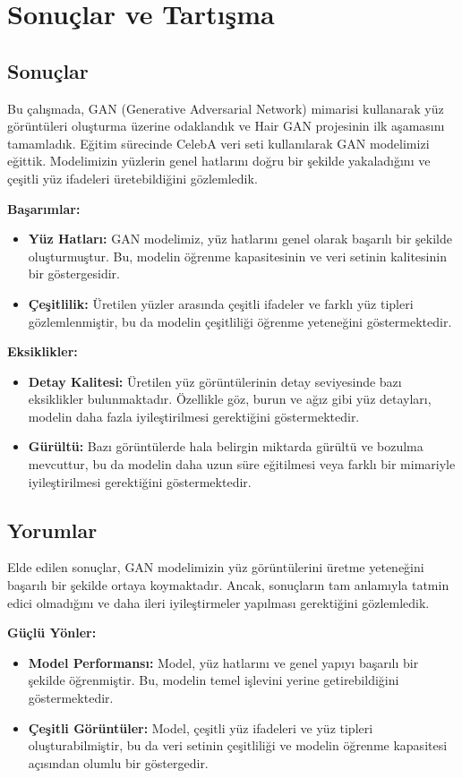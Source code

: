 \documentclass[12pt]{article}
\begin{document}
\clearpage
\section{Sonuçlar ve Tartışma}


\subsection{Sonuçlar}
Bu çalışmada, GAN (Generative Adversarial Network) mimarisi kullanarak yüz görüntüleri oluşturma üzerine odaklandık ve Hair GAN projesinin ilk aşamasını tamamladık. Eğitim sürecinde CelebA veri seti kullanılarak GAN modelimizi eğittik. Modelimizin yüzlerin genel hatlarını doğru bir şekilde yakaladığını ve çeşitli yüz ifadeleri üretebildiğini gözlemledik.

\textbf{Başarımlar:}
\begin{itemize}
    \item \textbf{Yüz Hatları:} GAN modelimiz, yüz hatlarını genel olarak başarılı bir şekilde oluşturmuştur. Bu, modelin öğrenme kapasitesinin ve veri setinin kalitesinin bir göstergesidir.
    \item \textbf{Çeşitlilik:} Üretilen yüzler arasında çeşitli ifadeler ve farklı yüz tipleri gözlemlenmiştir, bu da modelin çeşitliliği öğrenme yeteneğini göstermektedir.
\end{itemize}

\textbf{Eksiklikler:}
\begin{itemize}
    \item \textbf{Detay Kalitesi:} Üretilen yüz görüntülerinin detay seviyesinde bazı eksiklikler bulunmaktadır. Özellikle göz, burun ve ağız gibi yüz detayları, modelin daha fazla iyileştirilmesi gerektiğini göstermektedir.
    \item \textbf{Gürültü:} Bazı görüntülerde hala belirgin miktarda gürültü ve bozulma mevcuttur, bu da modelin daha uzun süre eğitilmesi veya farklı bir mimariyle iyileştirilmesi gerektiğini göstermektedir.
\end{itemize}

\subsection{Yorumlar}
Elde edilen sonuçlar, GAN modelimizin yüz görüntülerini üretme yeteneğini başarılı bir şekilde ortaya koymaktadır. Ancak, sonuçların tam anlamıyla tatmin edici olmadığını ve daha ileri iyileştirmeler yapılması gerektiğini gözlemledik.

\textbf{Güçlü Yönler:}
\begin{itemize}
    \item \textbf{Model Performansı:} Model, yüz hatlarını ve genel yapıyı başarılı bir şekilde öğrenmiştir. Bu, modelin temel işlevini yerine getirebildiğini göstermektedir.
    \item \textbf{Çeşitli Görüntüler:} Model, çeşitli yüz ifadeleri ve yüz tipleri oluşturabilmiştir, bu da veri setinin çeşitliliği ve modelin öğrenme kapasitesi açısından olumlu bir göstergedir.
\end{itemize}
\end{document}
